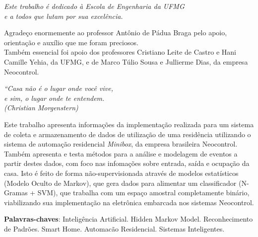 \documentclass[
	12pt,				%
	openright,			%
	twoside,			%
	a4paper,			%
	english,			%
	spanish,			%
	brazil,				%
	]{abntex2}\usepackage[]{graphicx}\usepackage[]{color}
\begin{document}
\frenchspacing 


\imprimircapa

\imprimirfolhaderosto

\begin{dedicatoria}
   \vspace*{\fill}
   \centering
   \noindent
   \textit{ Este trabalho é dedicado à Escola de Engenharia da UFMG \\
   	 e a todos que lutam por sua excelência. } \vspace*{\fill}
\end{dedicatoria}

\begin{agradecimentos}
Agradeço enormemente ao professor Antônio de Pádua Braga pelo apoio, orientação e auxílio que me foram preciosos.\\
Também essencial foi apoio dos professores Cristiano Leite de Castro e Hani Camille Yehia, da UFMG, e de Marco Túlio Sousa e Jullierme Dias, da empresa Neocontrol.
\end{agradecimentos}

\begin{epigrafe}
    \vspace*{\fill}
	\begin{flushright}
		\textit{``Casa não é o lugar onde você vive,\\
					e sim, o lugar onde te entendem.\\
		(Christian Morgenstern)}
	\end{flushright}
\end{epigrafe}

\setlength{\absparsep}{18pt} %
\begin{resumo}

 Este trabalho apresenta informações da implementação realizada para um sistema de coleta e armazenamento de dados de utilização de uma residência utilizando o sistema de automação residencial \textit{Minibox}, da empresa brasileira Neocontrol. Também apresenta e testa métodos para a análise e modelagem de eventos a partir destes dados, com foco nas infomações sobre entrada, saída e ocupação da casa. Isto é feito de forma não-supervisionada através de modelos estatísticos (Modelo Oculto de Markov), que gera dados para alimentar um classificador (N-Gramas + SVM), que trabalha com um espaço amostral completamente binário, viabilizando sua implementação na eletrônica embarcada nos sistemas Neocontrol.

 \textbf{Palavras-chaves}: Inteligência Artificial. Hidden Markov Model. Reconhecimento de Padrões. Smart Home. Automacão Residencial. Sistemas Inteligentes.
\end{resumo}
\end{document}
